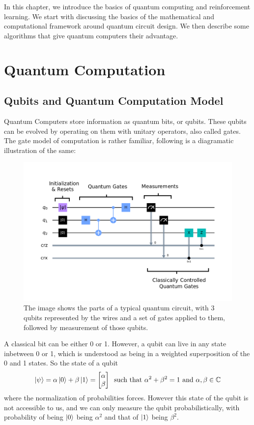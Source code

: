 In this chapter, we introduce the basics of quantum computing and reinforcement learning. We start with discussing the basics of the mathematical and computational framework around quantum circuit design. We then describe some algorithms that give quantum computers their advantage.


\section{Quantum Computation}


\subsection{Qubits and Quantum Computation Model}

Quantum Computers store information as quantum bits, or qubits. These qubits can be evolved by operating on them with unitary operators, also called gates. The gate model of computation is rather familiar, following is a diagramatic illustration of the same:

\begin{figure}[h]
    \centering
    \includegraphics[width=0.8\linewidth]{figures/quantum/quantum_circuit_example.png}
    \caption{The image shows the parts of a typical quantum circuit, with 3 qubits represented by the wires and a set of gates applied to them, followed by measurement of those qubits.}
    \label{fig:quantum-circuit-example}
\end{figure}


A classical bit can be either 0 or 1. However, a qubit can live in any state inbetween 0 or 1, which is understood as being in a weighted superposition of the 0 and 1 states. So the state of a qubit 
\begin{equation}
    \ket{\psi} = \alpha \ket{0} + \beta \ket{1} = \begin{bmatrix}\alpha \\ \beta\end{bmatrix} \;\;\text{such that }\alpha^2 + \beta^2 = 1 \text{ and } \alpha, \beta \in \mathbb{C}
\end{equation}
where the normalization of probabilities forces. However this state of the qubit is not accessible to us, and we can only measure the qubit probabilistically, with probability of being $\ket{0}$ being $\alpha^2$ and that of $\ket{1}$ being $\beta^2$.

